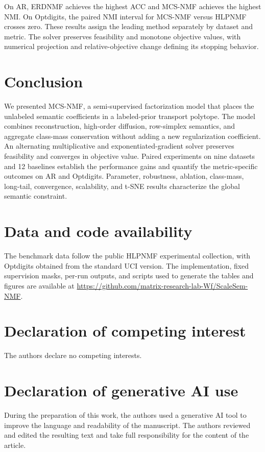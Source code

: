 \documentclass[times, review, 10pt]{elsarticle}
\begin{document}
On AR, ERDNMF achieves the highest ACC and MCS-NMF achieves the highest NMI. On Optdigits, the paired NMI interval for MCS-NMF versus HLPNMF crosses zero. These results assign the leading method separately by dataset and metric. The solver preserves feasibility and monotone objective values, with numerical projection and relative-objective change defining its stopping behavior.

\section{Conclusion}

We presented MCS-NMF, a semi-supervised factorization model that places the unlabeled semantic coefficients in a labeled-prior transport polytope. The model combines reconstruction, high-order diffusion, row-simplex semantics, and aggregate class-mass conservation without adding a new regularization coefficient. An alternating multiplicative and exponentiated-gradient solver preserves feasibility and converges in objective value. Paired experiments on nine datasets and 12 baselines establish the performance gains and quantify the metric-specific outcomes on AR and Optdigits. Parameter, robustness, ablation, class-mass, long-tail, convergence, scalability, and t-SNE results characterize the global semantic constraint.

\section*{Data and code availability}
The benchmark data follow the public HLPNMF experimental collection, with Optdigits obtained from the standard UCI version. The implementation, fixed supervision masks, per-run outputs, and scripts used to generate the tables and figures are available at \url{https://github.com/matrix-research-lab-Wf/ScaleSem-NMF}.

\section*{Declaration of competing interest}
The authors declare no competing interests.

\section*{Declaration of generative AI use}
During the preparation of this work, the authors used a generative AI tool to improve the language and readability of the manuscript. The authors reviewed and edited the resulting text and take full responsibility for the content of the article.
\end{document}
